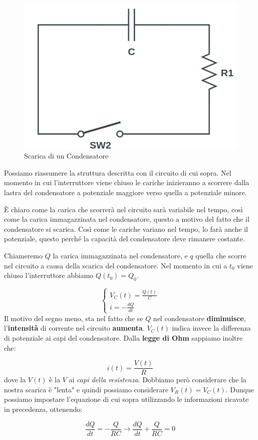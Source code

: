 \begin{figure}[th]
	\centering
	\includegraphics[width=0.5\linewidth]{Media/scarica_condensatore}
	\caption{Scarica di un Condensatore}
	\label{fig:scaricacondensatore}
\end{figure}

Possiamo riassumere la struttura descritta con il circuito di cui sopra. Nel momento in cui l'interruttore viene chiuso le cariche inizieranno a scorrere dalla lastra del condensatore a potenziale maggiore verso quella a potenziale minore.

 È chiaro come la carica che scorrerà nel circuito sarà variabile nel tempo, così come la carica immagazzinata nel condensatore, questo a motivo del fatto che il condensatore si scarica. Così come le cariche variano nel tempo, lo farà anche il potenziale, questo perché la capacità del condensatore deve rimanere costante. 
 
 Chiameremo $Q$ la carica immagazzinata nel condensatore, e $q$ quella che scorre nel circuito a causa della scarica del condensatore. 
Nel momento in cui a $t_0$ viene chiuso l'interruttore abbiamo $Q(t_0) = Q_0$. 

$$ \begin{cases}
	V_C(t) = 	\frac{Q(t)}{C}\\
	i = -\frac{dQ}{dt}
\end{cases}
$$
 Il motivo del segno meno, sta nel fatto che se  $Q$ nel condensatore \textbf{diminuisce}, l'\textbf{intensità} di corrente nel circuito \textbf{aumenta}. $V_C(t)$ indica invece la differenza di potenziale ai capi del condensatore. Dalla \textbf{legge di Ohm} sappiamo inoltre che: 

$$ i(t) = \frac{V(t)}{R} $$
dove la $V(t)$ è la $V$ ai \textit{capi della resistenza}. Dobbiamo però considerare che la nostra scarica è "lenta" e quindi possiamo considerare $V_R(t) = V_C(t)$. Dunque possiamo impostare l'equazione di cui sopra utilizzando le informazioni ricavate in precedenza, ottenendo: 

$$ \frac{dQ}{dt} = - \frac{Q}{RC}  \longrightarrow 	\frac{dQ}{dt} + \frac{Q}{RC} = 0$$

